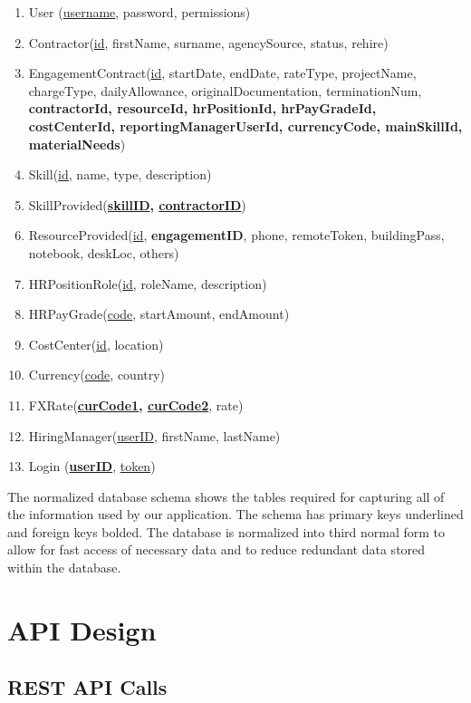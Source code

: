 \documentclass[11pt, titlepage]{article}
\begin{document}
\begin{enumerate}
    \item User (\underline{username}, password, permissions)
    \item Contractor(\underline{id}, firstName, surname, agencySource, status, rehire)
    \item EngagementContract(\underline{id}, startDate, endDate, rateType, projectName, chargeType, dailyAllowance, originalDocumentation, terminationNum, \textbf{contractorId, resourceId, hrPositionId, hrPayGradeId,  costCenterId, reportingManagerUserId, currencyCode, mainSkillId, materialNeeds})
    \item Skill(\underline{id}, name, type, description)
    \item SkillProvided(\textbf{\underline{skillID}, \underline{contractorID}})
    \item ResourceProvided(\underline{id}, \textbf{engagementID}, phone, remoteToken, buildingPass, notebook, deskLoc, others)
    \item HRPositionRole(\underline{id}, roleName, description)
    \item HRPayGrade(\underline{code}, startAmount, endAmount)
    \item CostCenter(\underline{id}, location)
    \item Currency(\underline{code}, country)
    \item FXRate(\textbf{\underline{curCode1}, \underline{curCode2}}, rate)
    \item HiringManager(\underline{userID}, firstName, lastName)
    \item Login (\textbf{\underline{userID}}, \underline{token})
\end{enumerate}

The normalized database schema shows the tables required for capturing all of the information used by our application. The schema has primary keys underlined and foreign keys bolded. The database is normalized into third normal form to allow for fast access of necessary data and to reduce redundant data stored within the database. 

\section{API Design}

\subsection{REST API Calls}
\end{document}
